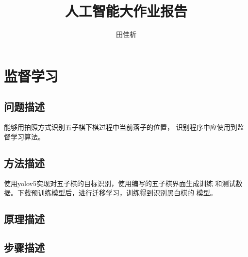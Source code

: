 \documentclass[UTF8]{article}
\title{人工智能大作业报告}
\author{田佳析}
\begin{document}
\maketitle
\tableofcontents

\section{监督学习}
\subsection{问题描述}
能够用拍照方式识别五子棋下棋过程中当前落子的位置，
识别程序中应使用到监督学习算法。
\subsection{方法描述}
使用yolov5实现对五子棋的目标识别，使用编写的五子棋界面生成训练
和测试数据。下载预训练模型后，进行迁移学习，训练得到识别黑白棋的
模型。
\subsection{原理描述}


\subsection{步骤描述}
\end{document}
